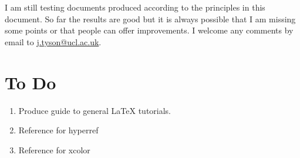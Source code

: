 \documentclass[]{article}
\begin{document}
I am still testing documents produced according to the principles in
this document. So far the results are good but it is always possible
that I am missing some points or that people can offer improvements. I
welcome any comments by email to
\href{my\%20ucl\%20email\%20address}{j.tyson@ucl.ac.uk}.

\hypertarget{to-do}{%
\section{To Do}\label{to-do}}

\begin{enumerate}
\def\labelenumi{\arabic{enumi}.}
\item
  Produce guide to general \LaTeX{} tutorials.
\item
  Reference for hyperref
\item
  Reference for xcolor
\end{enumerate}

\end{document}

